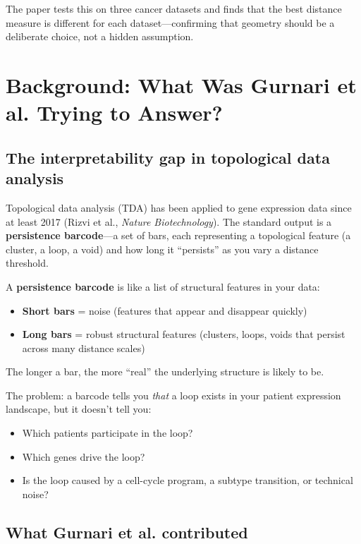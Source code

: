 \documentclass[11pt]{article}
\begin{document}
The paper tests this on three cancer datasets and finds that the best distance measure is different for each dataset---confirming that geometry should be a deliberate choice, not a hidden assumption.

\section{Background: What Was Gurnari et al. Trying to Answer?}

\subsection{The interpretability gap in topological data analysis}

Topological data analysis (TDA) has been applied to gene expression data since at least 2017 (Rizvi et al., \emph{Nature Biotechnology}). The standard output is a \textbf{persistence barcode}---a set of bars, each representing a topological feature (a cluster, a loop, a void) and how long it ``persists'' as you vary a distance threshold.

\begin{keyconcept}
A \textbf{persistence barcode} is like a list of structural features in your data:
\begin{itemize}[leftmargin=1.5em]
    \item \textbf{Short bars} = noise (features that appear and disappear quickly)
    \item \textbf{Long bars} = robust structural features (clusters, loops, voids that persist across many distance scales)
\end{itemize}
The longer a bar, the more ``real'' the underlying structure is likely to be.
\end{keyconcept}

The problem: a barcode tells you \emph{that} a loop exists in your patient expression landscape, but it doesn't tell you:
\begin{itemize}
    \item Which patients participate in the loop?
    \item Which genes drive the loop?
    \item Is the loop caused by a cell-cycle program, a subtype transition, or technical noise?
\end{itemize}

\subsection{What Gurnari et al. contributed}
\end{document}
